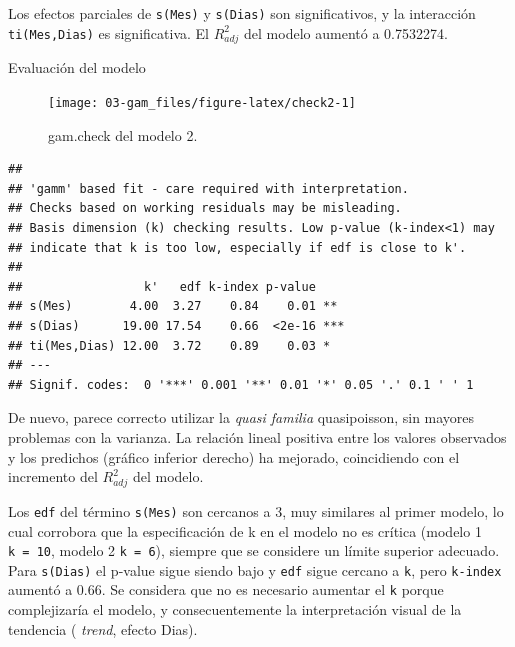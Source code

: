 \documentclass[
]{book}
\newenvironment{Shaded}{\begin{snugshade}}{\end{snugshade}}
\newcommand{\AttributeTok}[1]{\textcolor[rgb]{0.77,0.63,0.00}{#1}}
\newcommand{\DecValTok}[1]{\textcolor[rgb]{0.00,0.00,0.81}{#1}}
\newcommand{\FunctionTok}[1]{\textcolor[rgb]{0.00,0.00,0.00}{#1}}
\newcommand{\NormalTok}[1]{#1}
\newcommand{\SpecialCharTok}[1]{\textcolor[rgb]{0.00,0.00,0.00}{#1}}
\newcommand{\StringTok}[1]{\textcolor[rgb]{0.31,0.60,0.02}{#1}}
\begin{document}
Los efectos parciales de \texttt{s(Mes)} y \texttt{s(Dias)} son significativos, y la interacción \texttt{ti(Mes,Dias)} es significativa. El \(R_{adj}^{2}\) del modelo aumentó a 0.7532274.

Evaluación del modelo

\begin{Shaded}
\end{Shaded}

\begin{figure}

{\centering \texttt{[image: 03-gam\_files/figure-latex/check2-1]} 

}

\caption{gam.check del modelo 2.}\label{fig:check2}
\end{figure}

\begin{verbatim}
## 
## 'gamm' based fit - care required with interpretation.
## Checks based on working residuals may be misleading.
## Basis dimension (k) checking results. Low p-value (k-index<1) may
## indicate that k is too low, especially if edf is close to k'.
## 
##                 k'   edf k-index p-value    
## s(Mes)        4.00  3.27    0.84    0.01 ** 
## s(Dias)      19.00 17.54    0.66  <2e-16 ***
## ti(Mes,Dias) 12.00  3.72    0.89    0.03 *  
## ---
## Signif. codes:  0 '***' 0.001 '**' 0.01 '*' 0.05 '.' 0.1 ' ' 1
\end{verbatim}

De nuevo, parece correcto utilizar la \emph{quasi familia} quasipoisson, sin mayores problemas con la varianza. La relación lineal positiva entre los valores observados y los predichos (gráfico inferior derecho) ha mejorado, coincidiendo con el incremento del \(R_{adj}^{2}\) del modelo.

Los \texttt{edf} del término \texttt{s(Mes)} son cercanos a 3, muy similares al primer modelo, lo cual corrobora que la especificación de k en el modelo no es crítica (modelo 1 \texttt{k\ =\ 10}, modelo 2 \texttt{k\ =\ 6}), siempre que se considere un límite superior adecuado. Para \texttt{s(Dias)} el p-value sigue siendo bajo y \texttt{edf} sigue cercano a \texttt{k\textquotesingle{}}, pero \texttt{k-index} aumentó a 0.66. Se considera que no es necesario aumentar el \texttt{k} porque complejizaría el modelo, y consecuentemente la interpretación visual de la tendencia ( \emph{trend}, efecto Dias).
\end{document}
